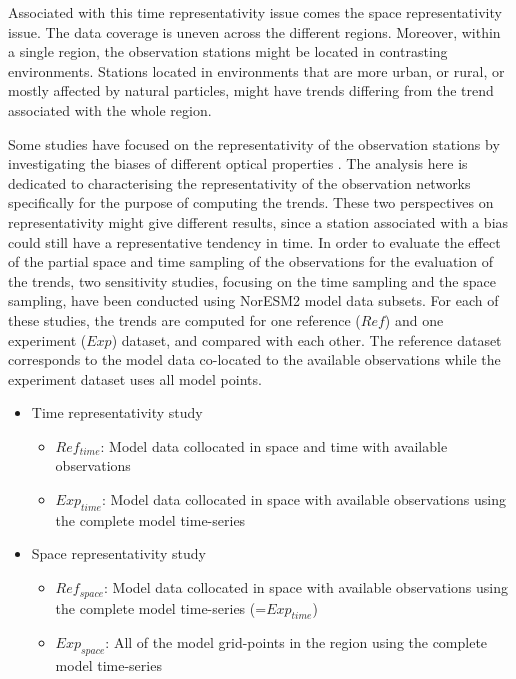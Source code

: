 \documentclass[acp, manuscript]{copernicus}
\begin{document}
Associated with this time representativity issue comes the space representativity issue. The data coverage is uneven across the different regions. Moreover, within a single region, the observation stations might be located in contrasting environments. Stations located in environments that are more urban, or rural, or mostly affected by natural particles, might have trends differing from the trend associated with the whole region.

Some studies have focused on the representativity of the observation stations by investigating the biases of different optical properties \citep{wang2017,schutgens2017spatio,schutgens2019site}. The analysis here is dedicated to characterising the  representativity of the observation networks specifically for the purpose of computing the trends. These two perspectives on representativity might give different results, since a station associated with a bias could still have a representative tendency in time. In order to evaluate the effect of the partial space and time sampling of the observations for the evaluation of the trends, two sensitivity studies, focusing on the time sampling and the space sampling, have been conducted using NorESM2 model data subsets. For each of these studies, the trends are computed for one reference ($Ref$) and one experiment ($Exp$) dataset, and compared with each other. The reference dataset corresponds to the model data co-located to the available observations while the experiment dataset uses all model points.
\begin{itemize}
 \item Time representativity study
       \begin{itemize}
        \item $Ref_{time}$: Model data collocated in space and time with available observations
        \item $Exp_{time}$: Model data collocated in space with available observations using the complete model time-series
       \end{itemize}
 \item Space representativity study
       \begin{itemize}
        \item $Ref_{space}$: Model data collocated in space with available observations using the complete model time-series (=$Exp_{time}$)
        \item $Exp_{space}$: All of the model grid-points in the region using the complete model time-series
       \end{itemize}
\end{itemize}
\end{document}

